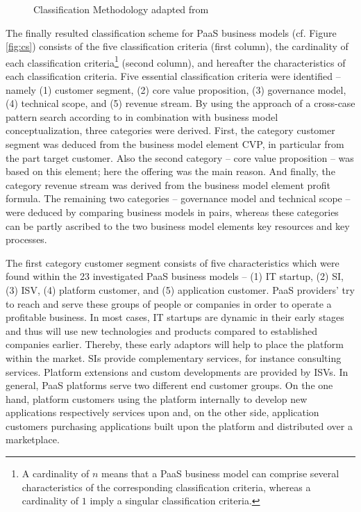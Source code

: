 \begin{figure}[t]
	\centering
	
	\caption[Classification Methodology]{Classification Methodology adapted from \citet[p. 44]{Fettke2003}}
	\label{fig:cm}
\end{figure}

The finally resulted classification scheme for \ac{PaaS} business models (cf. Figure \ref{fig:cs}) consists of the five classification criteria (first column), the cardinality of each classification criteria\footnote{A cardinality of $n$ means that a \ac{PaaS} business model can comprise several characteristics of the corresponding classification criteria, whereas a cardinality of $1$ imply a singular classification criteria.} (second column), and hereafter the characteristics of each classification criteria. Five essential classification criteria were identified -- namely (1) customer segment, (2) core value proposition, (3) governance model, (4) technical scope, and (5) revenue stream. By using the approach of a cross-case pattern search according to \citet{Eisenhardt1989} in combination with \citet{Johnson2008} business model conceptualization, three categories were derived. First, the category customer segment was deduced from the business model element \ac{CVP}, in particular from the part target customer. Also the second category -- core value proposition -- was based on this element; here the offering was the main reason. And finally, the category revenue stream was derived from the business model element profit formula. The remaining two categories -- governance model and technical scope -- were deduced by comparing business models in pairs, whereas these categories can be partly ascribed to the two business model elements key resources and key processes.

The first category customer segment consists of five characteristics which were found within the 23 investigated \ac{PaaS} business models --  (1) \ac{IT} startup, (2) \ac{SI}, (3) \ac{ISV}, (4) platform customer, and (5) application customer. \ac{PaaS} providers' try to reach and serve these groups of people or companies in order to operate a profitable business. In most cases, \ac{IT} startups are dynamic in their early stages and thus will use new technologies and products compared to established companies earlier. Thereby, these early adaptors will help to place the platform within the market. \acp{SI} provide complementary services, for instance consulting services. Platform extensions and custom developments are provided by \acp{ISV}. In general, \ac{PaaS} platforms serve two different end customer groups. On the one hand, platform customers using the platform internally to develop new applications respectively services upon and, on the other side, application customers purchasing applications built upon the platform and distributed over a marketplace.

